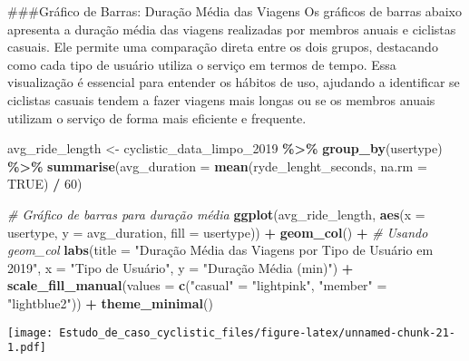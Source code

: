\documentclass[
]{article}
\newenvironment{Shaded}{\begin{snugshade}}{\end{snugshade}}
\newcommand{\AttributeTok}[1]{\textcolor[rgb]{0.13,0.29,0.53}{#1}}
\newcommand{\CommentTok}[1]{\textcolor[rgb]{0.56,0.35,0.01}{\textit{#1}}}
\newcommand{\ConstantTok}[1]{\textcolor[rgb]{0.56,0.35,0.01}{#1}}
\newcommand{\DecValTok}[1]{\textcolor[rgb]{0.00,0.00,0.81}{#1}}
\newcommand{\FunctionTok}[1]{\textcolor[rgb]{0.13,0.29,0.53}{\textbf{#1}}}
\newcommand{\NormalTok}[1]{#1}
\newcommand{\OtherTok}[1]{\textcolor[rgb]{0.56,0.35,0.01}{#1}}
\newcommand{\SpecialCharTok}[1]{\textcolor[rgb]{0.81,0.36,0.00}{\textbf{#1}}}
\newcommand{\StringTok}[1]{\textcolor[rgb]{0.31,0.60,0.02}{#1}}
\begin{document}
\#\#\#Gráfico de Barras: Duração Média das Viagens Os gráficos de barras
abaixo apresenta a duração média das viagens realizadas por membros
anuais e ciclistas casuais. Ele permite uma comparação direta entre os
dois grupos, destacando como cada tipo de usuário utiliza o serviço em
termos de tempo. Essa visualização é essencial para entender os hábitos
de uso, ajudando a identificar se ciclistas casuais tendem a fazer
viagens mais longas ou se os membros anuais utilizam o serviço de forma
mais eficiente e frequente.

\begin{Shaded}
\begin{Highlighting}[]
\NormalTok{avg\_ride\_length }\OtherTok{\textless{}{-}}\NormalTok{ cyclistic\_data\_limpo\_2019 }\SpecialCharTok{\%\textgreater{}\%}
  \FunctionTok{group\_by}\NormalTok{(usertype) }\SpecialCharTok{\%\textgreater{}\%}
  \FunctionTok{summarise}\NormalTok{(}\AttributeTok{avg\_duration =} \FunctionTok{mean}\NormalTok{(ryde\_lenght\_seconds, }\AttributeTok{na.rm =} \ConstantTok{TRUE}\NormalTok{) }\SpecialCharTok{/} \DecValTok{60}\NormalTok{)}

\CommentTok{\# Gráfico de barras para duração média}
\FunctionTok{ggplot}\NormalTok{(avg\_ride\_length, }\FunctionTok{aes}\NormalTok{(}\AttributeTok{x =}\NormalTok{ usertype, }\AttributeTok{y =}\NormalTok{ avg\_duration, }\AttributeTok{fill =}\NormalTok{ usertype)) }\SpecialCharTok{+}
  \FunctionTok{geom\_col}\NormalTok{() }\SpecialCharTok{+}  \CommentTok{\# Usando geom\_col}
  \FunctionTok{labs}\NormalTok{(}\AttributeTok{title =} \StringTok{"Duração Média das Viagens por Tipo de Usuário em 2019"}\NormalTok{, }
       \AttributeTok{x =} \StringTok{"Tipo de Usuário"}\NormalTok{, }
       \AttributeTok{y =} \StringTok{"Duração Média (min)"}\NormalTok{) }\SpecialCharTok{+}
  \FunctionTok{scale\_fill\_manual}\NormalTok{(}\AttributeTok{values =} \FunctionTok{c}\NormalTok{(}\StringTok{"casual"} \OtherTok{=} \StringTok{"lightpink"}\NormalTok{, }\StringTok{"member"} \OtherTok{=} \StringTok{"lightblue2"}\NormalTok{)) }\SpecialCharTok{+}
  \FunctionTok{theme\_minimal}\NormalTok{()}
\end{Highlighting}
\end{Shaded}

\texttt{[image: Estudo\_de\_caso\_cyclistic\_files/figure-latex/unnamed-chunk-21-1.pdf]}
\end{document}
